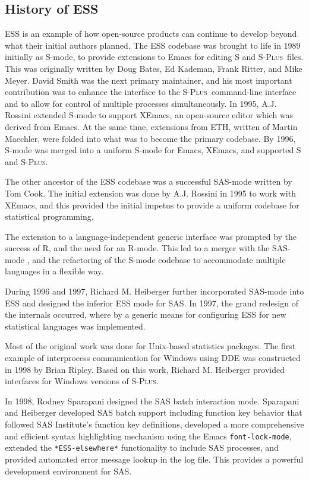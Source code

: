 \documentclass{article}
\newcommand*{\Splus}{\textsc{S-Plus}}
\newcommand{\stexttt}[1]{{\small\texttt{#1}}}
\begin{document}
\subsection{History of ESS}
\label{sec:ESS:history}

ESS is an example of how open-source products can continue to develop
beyond what their initial authors planned.  The ESS codebase was
brought to life in 1989 initially as S-mode, to provide extensions to
Emacs for editing S and \Splus\ files.  This was originally written by
Doug Bates, Ed Kademan, Frank Ritter, and Mike Meyer.  David Smith was
the next primary maintainer, and his most important contribution was
to enhance the interface to the \Splus\ command-line interface and to
allow for control of multiple processes simultaneously.  In 1995, A.J.
Rossini extended S-mode to support XEmacs, an open-source editor which
was derived from Emacs.  At the same time, extensions from ETH,
written of Martin Maechler, were folded into what was to become the
primary codebase.  By 1996, S-mode was merged into a uniform S-mode
for Emacs, XEmacs, and supported S and \Splus.

The other ancestor of the ESS codebase was a successful SAS-mode
written by Tom Cook.  The initial extension was done by A.J. Rossini
in 1995 to work with XEmacs, and this provided the initial impetus to
provide a uniform codebase for statistical programming.

The extension to a language-independent generic interface was prompted
by the success of R, and the need for an R-mode.  This led to a merger
with the SAS-mode \cite{SASMODE}, and the refactoring of the S-mode
codebase to accommodate multiple languages in a flexible way.

During 1996 and 1997, Richard M. Heiberger further incorporated
SAS-mode into ESS and designed the inferior ESS mode for SAS.  In
1997, the grand redesign of the internals occurred, where by a generic
means for configuring ESS for new statistical languages was
implemented. 

Most of the original work was done for Unix-based statistics packages.
The first example of interprocess communication for Windows using DDE
was constructed in 1998 by Brian Ripley.  Based on this work, Richard
M. Heiberger provided interfaces for Windows versions of \Splus.

In 1998, Rodney Sparapani designed the SAS batch interaction mode.
Sparapani and Heiberger developed SAS batch support including function
key behavior that followed SAS Institute's function key definitions,
developed a more comprehensive and efficient syntax highlighting
mechanism using the Emacs \stexttt{font-lock-mode}, extended the
\stexttt{*ESS-elsewhere*} functionality to include SAS processes, and
provided automated error message lookup in the log file.  This
provides a powerful development environment for SAS.
\end{document}

